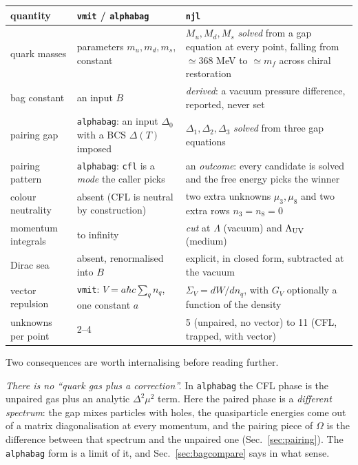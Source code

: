 \documentclass[aps,prc,onecolumn,superscriptaddress,nofootinbib,10pt]{revtex4-2}
\newcommand{\nq}{n_q}
\newcommand{\Lam}{\Lambda}
\newcommand{\GV}{G_V}
\begin{document}
\begin{center}
\footnotesize
\begin{tabular}{p{}p{}p{}}
\toprule
quantity & \texttt{vmit} / \texttt{alphabag} & \texttt{njl} \\
\midrule
quark masses & parameters $m_u,m_d,m_s$, constant &
  $M_u,M_d,M_s$ \emph{solved} from a gap equation at every point, falling from
  $\simeq 368$ MeV to $\simeq m_f$ across chiral restoration \\
bag constant & an input $B$ &
  \emph{derived}: a vacuum pressure difference, reported, never set \\
pairing gap & \texttt{alphabag}: an input $\Delta_0$ with a BCS $\Delta(T)$
  imposed & $\Delta_1,\Delta_2,\Delta_3$ \emph{solved} from three gap
  equations \\
pairing pattern & \texttt{alphabag}: \texttt{cfl} is a \emph{mode} the caller
  picks & an \emph{outcome}: every candidate is solved and the free energy
  picks the winner \\
colour neutrality & absent (CFL is neutral by construction) &
  two extra unknowns $\mu_3,\mu_8$ and two extra rows $n_3 = n_8 = 0$ \\
momentum integrals & to infinity & \emph{cut} at $\Lam$ (vacuum) and
  $\Lam_{\rm UV}$ (medium) \\
Dirac sea & absent, renormalised into $B$ &
  explicit, in closed form, subtracted at the vacuum \\
vector repulsion & \texttt{vmit}: $V = a\hbar c \sum_q n_q$, one constant $a$ &
  $\Sigma_V = dW/d\nq$, with $\GV$ optionally a function of the density \\
unknowns per point & 2--4 & 5 (unpaired, no vector) to 11 (CFL, trapped,
  with vector) \\
\bottomrule
\end{tabular}
\end{center}

Two consequences are worth internalising before reading further.

\emph{There is no ``quark gas plus a correction''.} In \texttt{alphabag} the
CFL phase is the unpaired gas plus an analytic $\Delta^2\mu^2$ term. Here the
paired phase is a \emph{different spectrum}: the gap mixes particles with
holes, the quasiparticle energies come out of a matrix diagonalisation at every
momentum, and the pairing piece of $\Omega$ is the difference between that
spectrum and the unpaired one (Sec.~\ref{sec:pairing}). The \texttt{alphabag}
form is a limit of it, and Sec.~\ref{sec:bagcompare} says in what sense.
\end{document}
